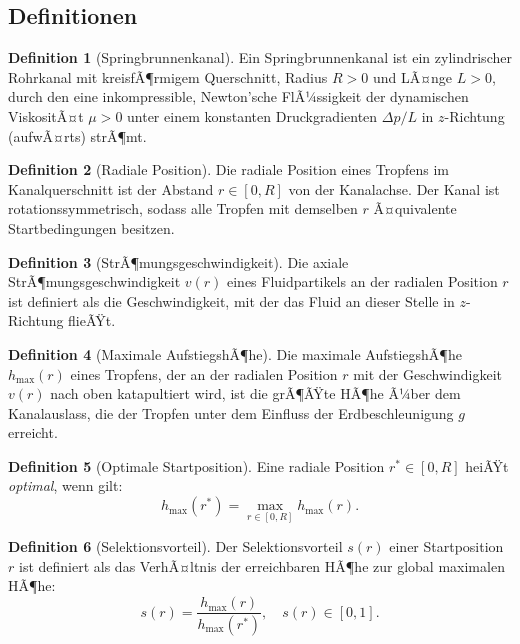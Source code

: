 ﻿\documentclass[a4paper,12pt]{article}
\theoremstyle{definition}
\newtheorem{definition}{Definition}
\begin{document}
\subsection{Definitionen}

\begin{definition}[Springbrunnenkanal]
    Ein Springbrunnenkanal ist ein zylindrischer Rohrkanal mit kreisfÃ¶rmigem Querschnitt,
    Radius $R > 0$ und LÃ¤nge $L > 0$, durch den eine inkompressible, Newton'sche FlÃ¼ssigkeit
    der dynamischen ViskositÃ¤t $\mu > 0$ unter einem konstanten Druckgradienten $\Delta p / L$
    in $z$-Richtung (aufwÃ¤rts) strÃ¶mt.
\end{definition}

\begin{definition}[Radiale Position]
    Die radiale Position eines Tropfens im Kanalquerschnitt ist der Abstand $r \in [0, R]$
    von der Kanalachse. Der Kanal ist rotationssymmetrisch, sodass alle Tropfen mit
    demselben $r$ Ã¤quivalente Startbedingungen besitzen.
\end{definition}

\begin{definition}[StrÃ¶mungsgeschwindigkeit]
    Die axiale StrÃ¶mungsgeschwindigkeit $v(r)$ eines Fluidpartikels an der radialen
    Position $r$ ist definiert als die Geschwindigkeit, mit der das Fluid an dieser
    Stelle in $z$-Richtung flieÃŸt.
\end{definition}

\begin{definition}[Maximale AufstiegshÃ¶he]
    Die maximale AufstiegshÃ¶he $h_{\max}(r)$ eines Tropfens, der an der radialen Position
    $r$ mit der Geschwindigkeit $v(r)$ nach oben katapultiert wird, ist die grÃ¶ÃŸte HÃ¶he
    Ã¼ber dem Kanalauslass, die der Tropfen unter dem Einfluss der Erdbeschleunigung $g$
    erreicht.
\end{definition}

\begin{definition}[Optimale Startposition]
    Eine radiale Position $r^* \in [0, R]$ heiÃŸt \emph{optimal}, wenn gilt:
    \[
    h_{\max}(r^*) = \max_{r \in [0, R]} h_{\max}(r).
    \]
\end{definition}

\begin{definition}[Selektionsvorteil]
    Der Selektionsvorteil $s(r)$ einer Startposition $r$ ist definiert als das VerhÃ¤ltnis
    der erreichbaren HÃ¶he zur global maximalen HÃ¶he:
    \[
    s(r) = \frac{h_{\max}(r)}{h_{\max}(r^*)}, \quad s(r) \in [0, 1].
    \]
\end{definition}
\end{document}

